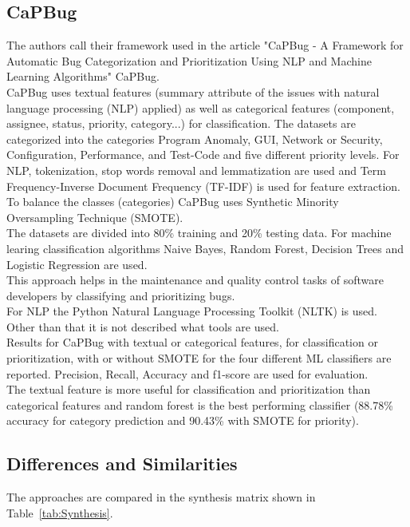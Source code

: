 \subsection{CaPBug}
The authors call their framework used in the article "CaPBug - A Framework for Automatic Bug Categorization and Prioritization Using NLP and Machine Learning Algorithms" \cite{Ahmed2021} CaPBug.\\
CaPBug uses textual features (summary attribute of the issues with natural language processing (NLP) applied) as well as categorical features (component, assignee, status, priority, category...) for classification. The datasets are categorized into the categories Program Anomaly, GUI, Network or Security, Configuration, Performance, and Test-Code and five different priority levels. For NLP, tokenization, stop words removal and lemmatization are used and Term Frequency-Inverse Document Frequency
(TF-IDF) is used for feature extraction. To balance the classes (categories) CaPBug uses Synthetic Minority Oversampling Technique (SMOTE).\\
The datasets are divided into 80\% training and 20\% testing data. For machine learing classification algorithms Naive Bayes, Random Forest, Decision Trees and Logistic Regression are used.\\
This approach helps in the maintenance and quality control tasks of software developers by classifying and prioritizing bugs. \\
For NLP the Python Natural Language Processing Toolkit (NLTK) is used. Other than that it is not described what tools are used.\\
Results for CaPBug with textual or categorical features, for classification or prioritization, with or without SMOTE for the four different ML classifiers are reported. Precision, Recall, Accuracy and f1-score are used for evaluation.\\
The textual feature is more useful for classification and prioritization than categorical features and random forest is the best performing classifier (88.78\% accuracy for category prediction and 90.43\% with SMOTE for priority).

\subsection{Differences and Similarities}

The approaches are compared in the synthesis matrix shown in \mbox{Table \ref{tab:Synthesis}}.\\

